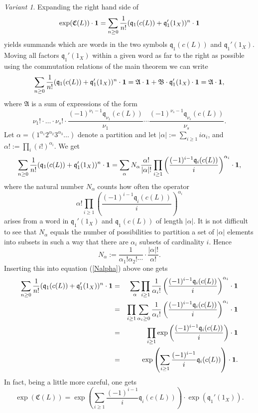 \documentclass[twoside,11pt]{article}
\newcommand{\beeq}[1]{\begin{eqnarray}\label{#1}}
\newcommand{\eneq}{\end{eqnarray}}
\newcommand{\gothq}{{\mathfrak q}}
\newcommand{\gothA}{{\mathfrak A}}
\newcommand{\gothB}{{\mathfrak B}}
\newcommand{\gothC}{{\mathfrak C}}
\newcommand{\qq}{\gothq}
\newcommand{\vacuum}{{\bf 1}}
\begin{document}
{\em Variant 1}. Expanding the right hand side of
$$\exp(\gothC(L))\cdot\vacuum=\sum_{n\geq0}\frac{1}{n!}(\qq_1(c(L))+\qq_1'(1_X))^n\cdot\vacuum
$$
yields summands which are words in the two symbols
$\qq_1(c(L))$ and $\qq_1'(1_X)$. Moving all factors $\qq_1'(1_X)$ within a
given word as far to the right as possible using the commutation relations of 
the main theorem we can write 
$$\sum_{n\geq0}\frac{1}{n!}(\qq_1(c(L))+\qq_1'(1_X))^n\cdot\vacuum
=\gothA\cdot\vacuum+\gothB\cdot\qq_1'(1_X)\cdot\vacuum=\gothA\cdot\vacuum,$$
where $\gothA$ is a sum of expressions of the form $$
\nu_1!\cdot\ldots\cdot\nu_s!\cdot
\frac{(-1)^{\nu_1-1}\qq_{\nu_1}(c(L))}{\nu_1}\cdots
\frac{(-1)^{\nu_s-1}\qq_{\nu_s}(c(L))}{\nu_s}.$$
Let $\alpha=(1^{\alpha_1}2^{\alpha_2}3^{\alpha_3}\ldots)$ denote a partition and let $|\alpha|:=\sum_{i\geq1}i\alpha_i$, and $\alpha!:=\prod_{i}(i!)^{\alpha_i}$. We get
\beeq{Nalpha}
\sum_{n\geq0}\frac{1}{n!}(\qq_1(c(L))+\qq_1'(1_X))^n\cdot\vacuum
=\sum_{\alpha} N_\alpha\frac{\alpha!}{|\alpha|!}
\prod_{i\geq1}\left(\frac{(-1)^{i-1}\qq_i(c(L))}{i}\right)^{\alpha_i}\cdot\vacuum,
\eneq
where the natural number $N_\alpha$ counts how often the operator
$$
{\alpha!}\prod_{i\geq1}
\left(\frac{(-1)^{i-1}\qq_i(c(L))}{i}\right)^{\alpha_i}
$$
arises from a word in $\qq_1'(1_X)$ and $\qq_1(c(L))$ of length $|\alpha|$.
It is not difficult to see that $N_\alpha$ equals the number of possibilities
to partition a set of $|\alpha|$ elements into subsets in such a way
that there are
$\alpha_i$ subsets of cardinality $i$. Hence
$$N_\alpha:=\frac{1}{\alpha_1!\alpha_2!\cdots}\cdot\frac{|\alpha|!}{\alpha!}.$$
Inserting this into equation (\ref{Nalpha}) above one gets
\begin{eqnarray*}
\sum_{n\geq0}\frac{1}{n!}(\qq_1(c(L))+\qq_1'(1_X))^n\cdot\vacuum
&=&\sum_{\alpha}\prod_{i\geq1}\frac{1}{\alpha_i!}
\left(\frac{(-1)^{i-1}\qq_i(c(L))}{i}\right)^{\alpha_i}\cdot\vacuum\\
&=&\prod_{i\geq1}\sum_{\alpha_i\geq0}\frac{1}{\alpha_i!}
\left(\frac{(-1)^{i-1}\qq_i(c(L))}{i}\right)^{\alpha_i}\cdot\vacuum\\
&=&\prod_{i\geq1}\exp\left(\frac{(-1)^{i-1}\qq_i(c(L))}{i}\right)\cdot\vacuum\\
&=&\exp\left(\sum_{i\geq1}\frac{(-1)^{i-1}}{i}\qq_i(c(L))\right)\cdot\vacuum
.
\end{eqnarray*}
In fact, being a little more careful, one gets
$$\exp(\gothC(L))=\exp\left(\sum_{i\geq1}\frac{(-1)^{i-1}}{i}\qq_i(c(L))\right)
\cdot\exp(\qq_1'(1_X)).$$
\end{document}
